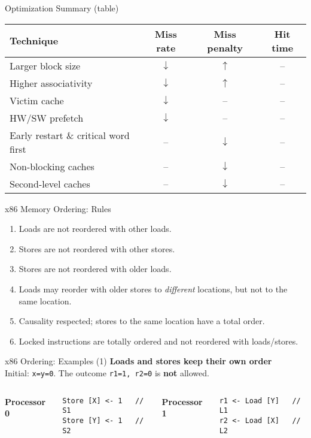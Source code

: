 \documentclass[aspectratio=169,12pt]{beamer}
\begin{document}
\begin{frame}{Optimization Summary (table)}
\begin{center}
\begin{tabular}{lccc}
\toprule
Technique & Miss rate & Miss penalty & Hit time\\
\midrule
Larger block size & $\downarrow$ & $\uparrow$ & --\\
Higher associativity & $\downarrow$ & $\uparrow$ & --\\
Victim cache & $\downarrow$ & -- & --\\
HW/SW prefetch & $\downarrow$ & -- & --\\
Early restart \& critical word first & -- & $\downarrow$ & --\\
Non-blocking caches & -- & $\downarrow$ & --\\
Second-level caches & -- & $\downarrow$ & --\\
\bottomrule
\end{tabular}
\end{center}
\end{frame}

\begin{frame}{x86 Memory Ordering: Rules}
\begin{enumerate}
  \item Loads are not reordered with other loads.
  \item Stores are not reordered with other stores.
  \item Stores are not reordered with older loads.
  \item Loads may reorder with older stores to \emph{different} locations, but not to the same location.
  \item Causality respected; stores to the same location have a total order.
  \item Locked instructions are totally ordered and not reordered with loads/stores.
\end{enumerate}
\end{frame}

\begin{frame}[fragile]{x86 Ordering: Examples (1)}
\textbf{Loads and stores keep their own order}\\[3pt]
Initial: \texttt{x=y=0}. The outcome \texttt{r1=1, r2=0} is \textbf{not} allowed.
\begin{columns}[T]
\textbf{Processor 0}
\begin{lstlisting}[basicstyle=\ttfamily\small]
Store [X] <- 1   // S1
Store [Y] <- 1   // S2
\end{lstlisting}
\textbf{Processor 1}
\begin{lstlisting}[basicstyle=\ttfamily\small]
r1 <- Load [Y]   // L1
r2 <- Load [X]   // L2
\end{lstlisting}
\end{columns}
\end{frame}
\end{document}
